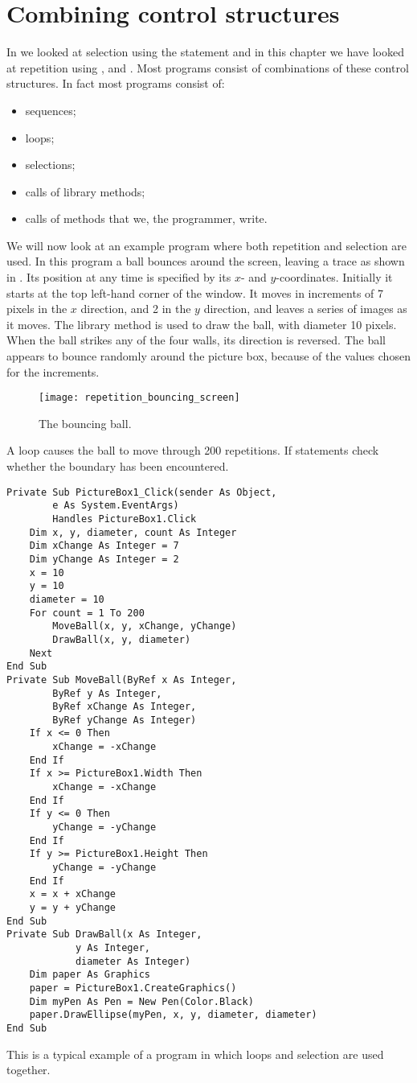 	\section{Combining control structures}
		In  we looked at selection using the  statement and in this chapter we have looked at repetition using ,  and . Most programs consist of combinations of these control structures. In fact most programs consist of:
		\begin{itemize}
	    \item sequences;
  	  \item loops;
    	\item selections;
	    \item calls of library methods;
  	  \item calls of methods that we, the programmer, write.
		\end{itemize}
		We will now look at an example program where both repetition and selection are used. In this program a ball bounces around the screen, leaving a trace as shown in . Its position at any time is specified by its $x$- and $y$-coordinates. Initially it starts at the top left-hand corner of the window. It moves in increments of 7 pixels in the $x$ direction, and 2 in the $y$ direction, and leaves a series of images as it moves. The library method  is used to draw the ball, with diameter 10 pixels. When the ball strikes any of the four walls, its direction is reversed. The ball appears to bounce randomly around the picture box, because of the values chosen for the increments.
		
		\begin{figure}[bth]
			\centering
			\texttt{[image: repetition\_bouncing\_screen]}
			\caption{The bouncing ball.}
			\label{fig:repetition_bouncing_screen}
		\end{figure}

		
		A  loop causes the ball to move through 200 repetitions. If statements check whether the boundary has been encountered.
		\begin{lstlisting}
Private Sub PictureBox1_Click(sender As Object,
		e As System.EventArgs)
		Handles PictureBox1.Click
	Dim x, y, diameter, count As Integer
	Dim xChange As Integer = 7
	Dim yChange As Integer = 2
	x = 10
	y = 10
	diameter = 10
	For count = 1 To 200
		MoveBall(x, y, xChange, yChange)
		DrawBall(x, y, diameter)
	Next
End Sub
Private Sub MoveBall(ByRef x As Integer,
		ByRef y As Integer,
		ByRef xChange As Integer,
		ByRef yChange As Integer)
	If x <= 0 Then
		xChange = -xChange
	End If
	If x >= PictureBox1.Width Then
		xChange = -xChange
	End If
	If y <= 0 Then
		yChange = -yChange
	End If
	If y >= PictureBox1.Height Then
		yChange = -yChange
	End If
	x = x + xChange
	y = y + yChange
End Sub
Private Sub DrawBall(x As Integer,
			y As Integer,
			diameter As Integer)
	Dim paper As Graphics
	paper = PictureBox1.CreateGraphics()			
	Dim myPen As Pen = New Pen(Color.Black)
	paper.DrawEllipse(myPen, x, y, diameter, diameter)
End Sub
		\end{lstlisting}
		This is a typical example of a program in which loops and selection are used together.


